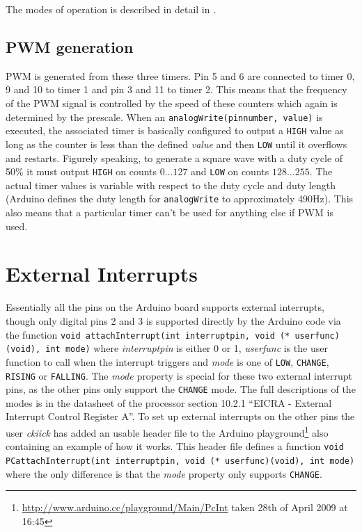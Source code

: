 \documentclass[a4paper, oneside, final]{memoir}
\begin{document}
The modes of operation is described in detail in \cite[Section 12.7]{atmel8p}.

\subsection{PWM generation}

PWM is generated from these three timers. Pin 5 and 6 are connected to timer 0,
9 and 10 to timer 1 and pin 3 and 11 to timer 2. This means that the frequency
of the PWM signal is controlled by the speed of these counters which again is
determined by the prescale. When an \texttt{analogWrite(pinnumber, value)} is
executed, the associated timer is basically configured to output a \texttt{HIGH}
value as long as the counter is less than the defined \textit{value} and then
\texttt{LOW} until it overflows and restarts. Figurely speaking, to generate a
square wave with a duty cycle of 50\% it must output \texttt{HIGH} on counts $0
\ldots 127$ and \texttt{LOW} on counts $128 \ldots 255$. The actual timer values
is variable with respect to the duty cycle and duty length (Arduino defines the
duty length for \texttt{analogWrite} to approximately 490Hz). This also means
that a particular timer can't be used for anything else if PWM is used.

\section{External Interrupts}
\label{sec:external-interrupts}

Essentially all the pins on the Arduino board supports external
interrupts, though only digital pins 2 and 3 is supported directly by
the Arduino code via the function \texttt{void attachInterrupt(int
  interruptpin, void (* userfunc)(void), int mode)} where
\textit{interruptpin} is either 0 or 1, \textit{userfunc} is the user
function to call when the interrupt triggers and \textit{mode} is one
of \texttt{LOW}, \texttt{CHANGE}, \texttt{RISING} or
\texttt{FALLING}. The \textit{mode} property is special for these two
external interrupt pins, as the other pins only support the
\texttt{CHANGE} mode. The full descriptions of the modes is in the
datasheet of the processor section 10.2.1 ``EICRA - External Interrupt
Control Register A''. To set up external interrupts on the other pins
the user \textit{ckiick} has added an usable header file to the Arduino
playground\footnote{\url{http://www.arduino.cc/playground/Main/PcInt}
  taken 28th of April 2009 at 16:45} also containing an
example of how it works. This header file defines a function
\texttt{void PCattachInterrupt(int interruptpin, void (*
  userfunc)(void), int mode)} where the only difference is that the
\textit{mode} property only supports \texttt{CHANGE}.
\end{document}
